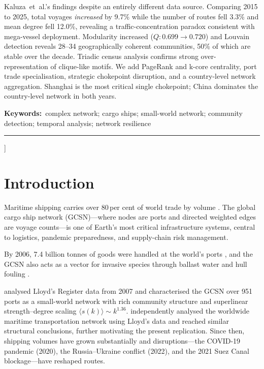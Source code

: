 \documentclass[a4paper,10pt,twocolumn]{article}
\begin{document}
{\begin{@twocolumnfalse}
{  Kaluza~et~al.'s findings despite an entirely different data source.
  Comparing 2015 to 2025, total voyages \emph{increased} by 9.7\%
  while the number of routes fell 3.3\% and mean degree fell 12.0\%,
  revealing a traffic-concentration paradox consistent with
  mega-vessel deployment.
  Modularity increased ($Q:0.699\to0.720$) and Louvain detection
  reveals 28--34 geographically coherent communities,
  50\% of which are stable over the decade.
  Triadic census analysis confirms strong over-representation of
  clique-like motifs.
  We add PageRank and k-core centrality, port trade specialisation,
  strategic chokepoint disruption, and a country-level network
  aggregation.
  Shanghai is the most critical single chokepoint;
  China dominates the country-level network in both years.\par}
  \vspace{6pt}
  {\fontsize{9}{11}\selectfont
  \textbf{Keywords:}\ complex network; cargo ships;
  small-world network; community detection;
  temporal analysis; network resilience\par}
  \vspace{12pt}
  \rule{\linewidth}{0.4pt}
  \vspace{6pt}
\end{@twocolumnfalse}
}]

\section{Introduction}

Maritime shipping carries over 80\,per cent of world trade by volume
\citep{UNCTAD2023}.
The global cargo ship network (GCSN)---where nodes are ports and
directed weighted edges are voyage counts---is one of Earth's most
critical infrastructure systems, central to logistics, pandemic
preparedness, and supply-chain risk management.

By 2006, 7.4 billion tonnes of goods were handled at the world's
ports \citep{IMO2006}, and the GCSN also acts as a vector for
invasive species through ballast water and hull fouling
\citep{Kaluza2010}.

\citet{Kaluza2010} analysed Lloyd's Register data from 2007 and
characterised the GCSN over 951 ports as a small-world network
\citep{Watts1998} with rich community structure and superlinear
strength--degree scaling $\langle s(k)\rangle\!\sim\!k^{1.36}$.
\citet{Hu2009} independently analysed the worldwide maritime
transportation network using Lloyd's data and reached similar
structural conclusions, further motivating the present replication.
Since then, shipping volumes have grown substantially and
disruptions---the COVID-19 pandemic (2020), the Russia--Ukraine
conflict (2022), and the 2021 Suez Canal blockage---have reshaped
routes.
\end{document}
